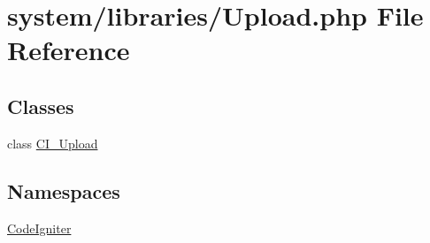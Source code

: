 \hypertarget{_upload_8php}{}\section{system/libraries/\+Upload.php File Reference}
\label{_upload_8php}
\subsection*{Classes}
\begin{DoxyCompactItemize}
\item 
class \mbox{\hyperlink{class_c_i___upload}{C\+I\+\_\+\+Upload}}
\end{DoxyCompactItemize}
\subsection*{Namespaces}
\begin{DoxyCompactItemize}
\item 
 \mbox{\hyperlink{namespace_code_igniter}{Code\+Igniter}}
\end{DoxyCompactItemize}
